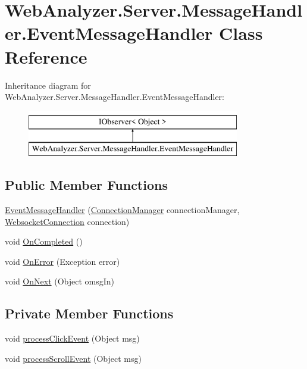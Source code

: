 \hypertarget{class_web_analyzer_1_1_server_1_1_message_handler_1_1_event_message_handler}{}\section{Web\+Analyzer.\+Server.\+Message\+Handler.\+Event\+Message\+Handler Class Reference}
\label{class_web_analyzer_1_1_server_1_1_message_handler_1_1_event_message_handler}
Inheritance diagram for Web\+Analyzer.\+Server.\+Message\+Handler.\+Event\+Message\+Handler\+:\begin{figure}[H]
\begin{center}
\leavevmode
\includegraphics[height=2.000000cm]{class_web_analyzer_1_1_server_1_1_message_handler_1_1_event_message_handler}
\end{center}
\end{figure}
\subsection*{Public Member Functions}
\begin{DoxyCompactItemize}
\item 
\hyperlink{class_web_analyzer_1_1_server_1_1_message_handler_1_1_event_message_handler_a9f2737386e78cc6bafd9a38c132631a8}{Event\+Message\+Handler} (\hyperlink{class_web_analyzer_1_1_server_1_1_connection_manager}{Connection\+Manager} connection\+Manager, \hyperlink{class_web_analyzer_1_1_server_1_1_websocket_connection}{Websocket\+Connection} connection)
\item 
void \hyperlink{class_web_analyzer_1_1_server_1_1_message_handler_1_1_event_message_handler_a19e447a4cbabc5a9f8b3a04af58c5d43}{On\+Completed} ()
\item 
void \hyperlink{class_web_analyzer_1_1_server_1_1_message_handler_1_1_event_message_handler_a88c6d373560e656f48dd245a60dd5050}{On\+Error} (Exception error)
\item 
void \hyperlink{class_web_analyzer_1_1_server_1_1_message_handler_1_1_event_message_handler_ab517345494b9c59dcd2fefadcdc7b459}{On\+Next} (Object omsg\+In)
\end{DoxyCompactItemize}
\subsection*{Private Member Functions}
\begin{DoxyCompactItemize}
\item 
void \hyperlink{class_web_analyzer_1_1_server_1_1_message_handler_1_1_event_message_handler_a52530ca07c3d1bfc722b3906db0616a9}{process\+Click\+Event} (Object msg)
\item 
void \hyperlink{class_web_analyzer_1_1_server_1_1_message_handler_1_1_event_message_handler_ad9e18e2cac18514602414d5a53ad79bd}{process\+Scroll\+Event} (Object msg)
\end{DoxyCompactItemize}
